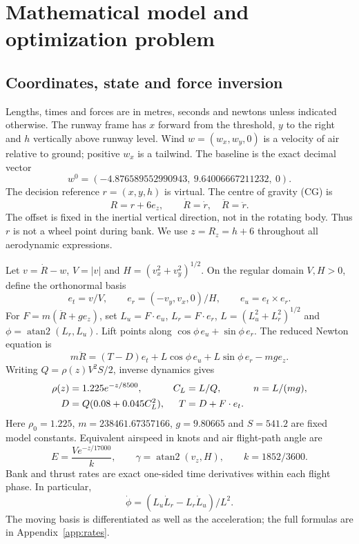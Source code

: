 \section{Mathematical model and optimization problem}\label{sec:model}
\subsection{Coordinates, state and force inversion}
Lengths, times and forces are in metres, seconds and newtons unless indicated otherwise. The runway frame has $x$ forward from the threshold, $y$ to the right and $h$ vertically above runway level. Wind $w=(w_x,w_y,0)$ is a velocity of air relative to ground; positive $w_x$ is a tailwind. The baseline is the exact decimal vector
\begin{equation}\label{eq:wind}
 w^0=(-4.876589552990943,\ 9.64006667211232,\ 0).
\end{equation}
The decision reference $r=(x,y,h)$ is virtual. The centre of gravity (CG) is
\begin{equation}\label{eq:cg}
 R=r+6e_z,\qquad \dot R=\dot r,\quad\ddot R=\ddot r.
\end{equation}
The offset is fixed in the inertial vertical direction, not in the rotating body. Thus $r$ is not a wheel point during bank. We use $z=R_z=h+6$ throughout all aerodynamic expressions.

Let $v=\dot R-w$, $V=|v|$ and $H=(v_x^2+v_y^2)^{1/2}$. On the regular domain $V,H>0$, define the orthonormal basis
\begin{equation}\label{eq:basis}
 e_t=v/V,\qquad e_r=(-v_y,v_x,0)/H,\qquad e_u=e_t\times e_r.
\end{equation}
For $F=m(\ddot R+ge_z)$, set $L_u=F\cdot e_u$, $L_r=F\cdot e_r$, $L=(L_u^2+L_r^2)^{1/2}$ and $\phi=\operatorname{atan2}(L_r,L_u)$. Lift points along $\cos\phi\,e_u+\sin\phi\,e_r$. The reduced Newton equation is
\begin{equation}\label{eq:newton}
 m\ddot R=(T-D)e_t+L\cos\phi\,e_u+L\sin\phi\,e_r-mge_z.
\end{equation}
Writing $Q=\rho(z)V^2S/2$, inverse dynamics gives
\begin{align}\label{eq:force}
 \rho(z)&=1.225e^{-z/8500}, & C_L&=L/Q, & n&=L/(mg),\notag\\
 D&=Q(0.08+0.045C_L^2), & T&=D+F\cdot e_t.
\end{align}
Here $\rho_0=1.225$, $m=238461.67357166$, $g=9.80665$ and $S=541.2$ are fixed model constants. Equivalent airspeed in knots and air flight-path angle are
\begin{equation}\label{eq:eas}
 E=\frac{V e^{-z/17000}}{k},\qquad
 \gamma=\operatorname{atan2}(v_z,H),\qquad k=1852/3600.
\end{equation}
Bank and thrust rates are exact one-sided time derivatives within each flight phase. In particular,
\begin{equation}\label{eq:roll}
 \dot\phi=(L_u\dot L_r-L_r\dot L_u)/L^2.
\end{equation}
The moving basis is differentiated as well as the acceleration; the full formulas are in Appendix~\ref{app:rates}.

